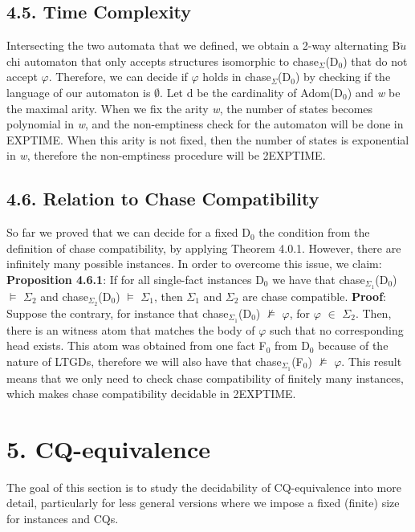 \documentclass[11pt, a4paper, dvipsnames]{article}
\begin{document}
\subsection{4.5. Time Complexity}
Intersecting the two automata that we defined, we obtain a 2-way alternating B$\ddot{u}$chi automaton that only accepts structures isomorphic to chase$_{\Sigma}$(D$_{0}$) that do not accept $\varphi$. Therefore, we can decide if $\varphi$ holds in chase$_{\Sigma}$(D$_{0}$) by checking if the language of our automaton is $\emptyset$.\newline
Let d be the cardinality of Adom(D$_{0}$) and \textit{w} be the maximal arity. When we fix the arity \textit{w}, the number of states becomes polynomial in \textit{w}, and the non-emptiness check for the automaton will be done in EXPTIME. When this arity is not fixed, then the number of states is exponential in \textit{w}, therefore the non-emptiness procedure will be 2EXPTIME.

\subsection{4.6. Relation to Chase Compatibility}
So far we proved that we can decide for a fixed D$_{0}$ the condition from the definition of chase compatibility, by applying Theorem 4.0.1. However, there are infinitely many possible instances. In order to overcome this issue, we claim:\newline
\textbf{Proposition 4.6.1}: If for all single-fact instances D$_{0}$ we have that chase$_{\Sigma_{1}}$(D$_{0}$) $\vDash$ $\Sigma_{2}$ and chase$_{\Sigma_{2}}$(D$_{0}$) $\vDash$ $\Sigma_{1}$, then $\Sigma_{1}$ and $\Sigma_{2}$ are chase compatible.\newline
\textbf{Proof}: Suppose the contrary, for instance that chase$_{\Sigma_{1}}$(D$_{0}$) $\nvDash$ $\varphi$, for $\varphi$ $\in$ $\Sigma_{2}$. Then, there is an witness atom that matches the body of $\varphi$ such that no corresponding head exists. This atom was obtained from one fact F$_{0}$ from D$_{0}$ because of the nature of LTGDs, therefore we will also have that chase$_{\Sigma_{1}}$(F$_{0}$) $\nvDash$ $\varphi$. \newline
This result means that we only need to check chase compatibility of finitely many instances, which makes chase compatibility decidable in 2EXPTIME.

\newpage

\section{5. CQ-equivalence}
The goal of this section is to study the decidability of CQ-equivalence into more detail, particularly for less general versions where we impose a fixed (finite) size for instances and CQs.
\end{document}
